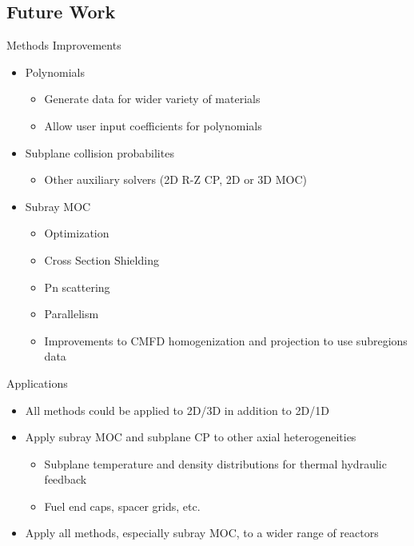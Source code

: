 
\subsection{Future Work}
\begin{frame}[t]{Methods Improvements}
    
    \begin{itemize}
        \item Polynomials
        \begin{itemize}
            \item Generate data for wider variety of materials
            \item Allow user input coefficients for polynomials
        \end{itemize}
        \item Subplane collision probabilites
        \begin{itemize}
            \item Other auxiliary solvers (2D R-Z CP, 2D or 3D MOC)
        \end{itemize}
        \item Subray MOC
        \begin{itemize}
            \item Optimization
            \item Cross Section Shielding
            \item Pn scattering
            \item Parallelism
            \item Improvements to CMFD homogenization and projection to use subregions data
        \end{itemize}
    \end{itemize}
    
\end{frame}


\begin{frame}[t]{Applications}
    
    \begin{itemize}
        \item All methods could be applied to 2D/3D in addition to 2D/1D
        \item Apply subray MOC and subplane CP to other axial heterogeneities
        \begin{itemize}
            \item Subplane temperature and density distributions for thermal hydraulic feedback
            \item Fuel end caps, spacer grids, etc.
        \end{itemize}
        \item Apply all methods, especially subray MOC, to a wider range of reactors
    \end{itemize}

\end{frame}

